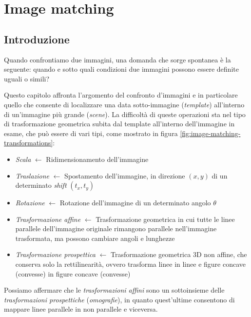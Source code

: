 \chapter{Image matching}
\label{chap:image-matching}


\section{Introduzione}
\label{sec:image-matching-intro}
Quando confrontiamo due immagini, una domanda che sorge spontanea \`e la seguente: quando e sotto quali condizioni due immagini possono essere definite uguali o simili?\par
Questo capitolo affronta l'argomento del confronto d'immagini e in particolare quello che consente di localizzare una data sotto-immagine (\textit{template}) all'interno di un'immagine pi\`u grande (\textit{scene}). La difficolt\`a di queste operazioni sta nel tipo di trasformazione geometrica subita dal template all'interno dell'immagine in esame, che pu\`o essere di vari tipi, come mostrato in figura \ref{fig:image-matching-transformations}:
\begin{itemize}
	\item \textit{Scala} $\gets$ Ridimensionamento dell'immagine
	\item \textit{Traslazione} $\gets$ Spostamento dell'immagine, in direzione $(x, y)$ di un determinato \textit{shift} $(t_{x}, t_{y})$
	\item \textit{Rotazione} $\gets$ Rotazione dell'immagine di un determinato angolo $\theta$
	\item \textit{Trasformazione affine} $\gets$ Trasformazione geometrica in cui tutte le linee parallele dell'immagine originale rimangono parallele nell'immagine trasformata, ma possono cambiare angoli e lunghezze
	\item \textit{Trasformazione prospettica} $\gets$ Trasformazione geometrica 3D non affine, che conserva solo la rettilinearit\`a, ovvero trasforma linee in linee e figure concave (convesse) in figure concave (convesse)
\end{itemize}
Possiamo affermare che le \textit{trasformazioni affini} sono un sottoinsieme delle \textit{trasformazioni prospettiche} (\textit{omografie}), in quanto quest'ultime consentono di mappare linee parallele in non parallele e viceversa.\par
\pgfplotsset{compat=1.9}
